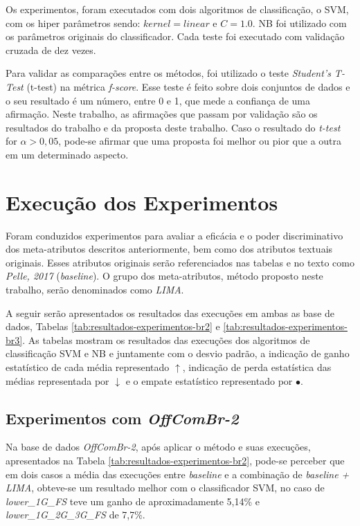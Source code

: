Os experimentos, foram executados com dois algoritmos de classificação, o SVM, com os hiper parâmetros sendo: $kernel=linear$ e $C=1.0$. NB foi utilizado com os parâmetros originais do classificador. Cada teste foi executado com validação cruzada de dez vezes.

Para validar as comparações entre os métodos, foi utilizado o teste {\it Student’s T-Test} (t-test) na métrica {\it f-score}. Esse teste é feito sobre dois conjuntos de dados e o seu resultado é um número, entre 0 e 1, que mede a confiança de uma afirmação. Neste trabalho, as afirmações que passam por validação são os resultados do trabalho \cite{Pelle2017} e da proposta deste trabalho. Caso o resultado do {\it t-test} for $\alpha > 0,05$, pode-se afirmar que uma proposta foi melhor ou pior que a outra em um determinado aspecto.

\section{Execução dos Experimentos}\label{sec:proposta-experimentos}

Foram conduzidos experimentos para avaliar a eficácia e o poder discriminativo dos meta-atributos
descritos anteriormente, bem como dos atributos textuais originais. Esses atributos originais serão referenciados nas tabelas e no texto como {\it Pelle, 2017} ({\it baseline}). O grupo dos meta-atributos, método proposto neste trabalho, serão denominados como {\it LIMA}.

A seguir serão apresentados os resultados das execuções em ambas as base de dados, Tabelas \ref{tab:resultados-experimentos-br2} e \ref{tab:resultados-experimentos-br3}. As tabelas mostram os resultados das execuções dos algoritmos de classificação SVM e NB e juntamente com o desvio padrão, a indicação de ganho estatístico de cada média representado $\uparrow$, indicação de perda estatística das médias representada por $\downarrow$ e o empate estatístico representado por $\bullet$.

\subsection{Experimentos com {\it OffComBr-2}}

Na base de dados {\it OffComBr-2}, após aplicar o método e suas execuções, apresentados na Tabela \ref{tab:resultados-experimentos-br2}, pode-se perceber que em dois casos a média das execuções entre {\it baseline} e a combinação de {\it baseline + LIMA}, obteve-se um resultado melhor com o classificador SVM, no caso de {\it lower\_1G\_FS} teve um ganho de aproximadamente 5,14\% e {\it lower\_1G\_2G\_3G\_FS} de 7,7\%.

